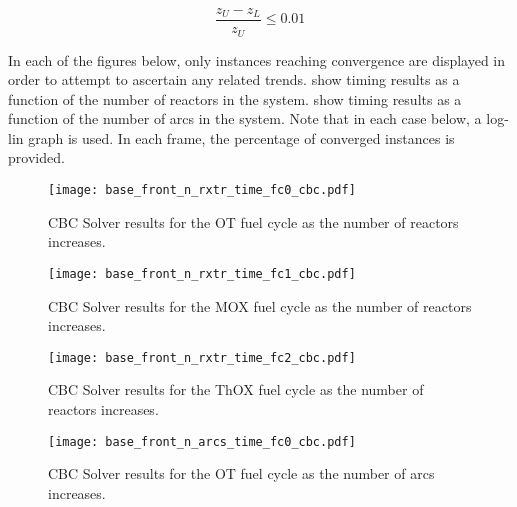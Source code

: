 \begin{equation}\label{eqn:ratio_gap}
\frac{z_U - z_L}{z_U} \leq 0.01
\end{equation}

In each of the figures below, only instances reaching convergence are displayed
in order to attempt to ascertain any related
trends. 
show timing results as a function of the number of reactors in the
system. 
show timing results as a function of the number of arcs in the system. Note that
in each case below, a log-lin graph is used. In each frame, the percentage of
converged instances is provided.

\begin{figure}[h!]
  \begin{center}
    \texttt{[image: base\_front\_n\_rxtr\_time\_fc0\_cbc.pdf]}
    \caption[]{
      \label{fig:base_front_n_rxtr_time_fc0_cbc}
      CBC Solver results for the OT fuel cycle as the number of reactors
      increases.
      }
  \end{center}
\end{figure}

\begin{figure}[h!]
  \begin{center}
    \texttt{[image: base\_front\_n\_rxtr\_time\_fc1\_cbc.pdf]}
    \caption[]{
      \label{fig:base_front_n_rxtr_time_fc1_cbc}
      CBC Solver results for the MOX fuel cycle as the number of reactors
      increases.
      }
  \end{center}
\end{figure}

\begin{figure}[h!]
  \begin{center}
    \texttt{[image: base\_front\_n\_rxtr\_time\_fc2\_cbc.pdf]}
    \caption[]{
      \label{fig:base_front_n_rxtr_time_fc2_cbc}
      CBC Solver results for the ThOX fuel cycle as the number of reactors
      increases.
      }
  \end{center}
\end{figure}

\begin{figure}[h!]
  \begin{center}
    \texttt{[image: base\_front\_n\_arcs\_time\_fc0\_cbc.pdf]}
    \caption[]{
      \label{fig:base_front_n_arcs_time_fc0_cbc}
      CBC Solver results for the OT fuel cycle as the number of arcs
      increases.
      }
  \end{center}
\end{figure}


